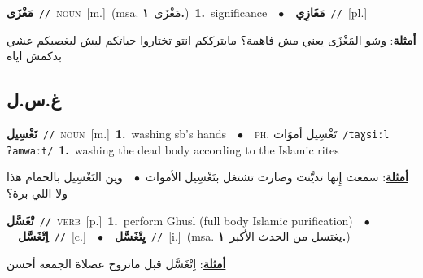 \documentclass[10pt,a4paper,twoside]{article} %
\begin{document}
\begin{multicols}{2}
{\setlength\topsep{0pt}\textbf{\foreignlanguage{arabic}{مَغْزَى}}\ {\color{gray}\texttt{//}\color{black}}\ \textsc{noun}\ [m.]\ \color{gray}(msa. \foreignlanguage{arabic}{مَغْزَى}~\foreignlanguage{arabic}{\textbf{١.}})\color{black}\ \textbf{1.}~significance\ \ $\bullet$\ \ \setlength\topsep{0pt}\textbf{\foreignlanguage{arabic}{مَغَازِي}}\ {\color{gray}\texttt{//}\color{black}}\ [pl.]\  \begin{flushright}\color{gray}\foreignlanguage{arabic}{\textbf{\underline{\foreignlanguage{arabic}{أمثلة}}}: وشو المَغْزَى يعني مش فاهمة؟ مايترككم انتو تختاروا حياتكم ليش ليغصبكم عشي بدكمش اياه}\end{flushright}\color{black}} \vspace{2mm}

\vspace{-3mm}
\subsection*{\color{blue}\foreignlanguage{arabic}{غ.س.ل}\color{blue}{}} 

{\setlength\topsep{0pt}\textbf{\foreignlanguage{arabic}{تَغْسِيل}}\ {\color{gray}\texttt{//}\color{black}}\ \textsc{noun}\ [m.]\ \textbf{1.}~washing sb's hands\ \ $\bullet$\ \ \textsc{ph.} \color{gray} \foreignlanguage{arabic}{تَغْسِيل أموَات}\color{black}\ {\color{gray}\texttt{/{\sffamily taɣsiːl ʔamwaːt}/}\color{black}}\ \textbf{1.}~washing the dead body according to the Islamic rites\  \begin{flushright}\color{gray}\foreignlanguage{arabic}{\textbf{\underline{\foreignlanguage{arabic}{أمثلة}}}: سمعت إِنها تديَّنت وصارت تشتغل بتَغْسِيل الأموات\ $\bullet$\ \  وين التَغْسِيل بالحمام هذا ولا اللي برة؟}\end{flushright}\color{black}} \vspace{2mm}

{\setlength\topsep{0pt}\textbf{\foreignlanguage{arabic}{تْغَسَّل}}\ {\color{gray}\texttt{//}\color{black}}\ \textsc{verb}\ [p.]\ \textbf{1.}~perform Ghusl (full body Islamic purification)\ \ $\bullet$\ \ \setlength\topsep{0pt}\textbf{\foreignlanguage{arabic}{اِتْغَسَّل}}\ {\color{gray}\texttt{//}\color{black}}\ [c.]\ \ $\bullet$\ \ \setlength\topsep{0pt}\textbf{\foreignlanguage{arabic}{يِتْغَسَّل}}\ {\color{gray}\texttt{//}\color{black}}\ [i.]\ \color{gray}(msa. \foreignlanguage{arabic}{يغتسل من الحدث الأكبر}~\foreignlanguage{arabic}{\textbf{١.}})\color{black}\  \begin{flushright}\color{gray}\foreignlanguage{arabic}{\textbf{\underline{\foreignlanguage{arabic}{أمثلة}}}: اِتْغَسَّل قبل ماتروح عصلاة الجمعة أحسن}\end{flushright}\color{black}} \vspace{2mm}


\end{multicols}
\end{document}
